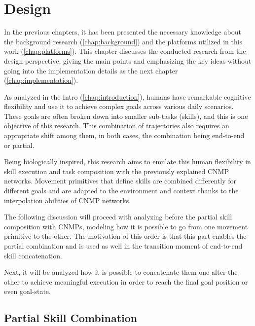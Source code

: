 \chapter{Design} 
\label{chap:design}

In the previous chapters, it has been presented the necessary knowledge about the background research (\cref{chap:background}) and the platforms utilized in this work (\cref{chap:platforms}). 
This chapter discusses the conducted research from the design perspective, giving the main points and emphasizing the key ideas without going into the implementation details as the next chapter (\cref{chap:implementation}). 

As analyzed in the Intro (\cref{chap:introduction}), humans have remarkable cognitive flexibility and use it to achieve complex goals across various daily scenarios. These goals are often broken down into smaller sub-tasks (skills), and this is one objective of this research. This combination of trajectories also requires an appropriate shift among them, in both cases, the combination being end-to-end or partial. 

Being biologically inspired, this research aims to emulate this human flexibility in skill execution and task composition with the previously explained CNMP networks. Movement primitives that define skills are combined differently for different goals and are adapted to the environment and context thanks to the interpolation abilities of CNMP networks.

The following discussion will proceed with analyzing before the partial skill composition with CNMPs, modeling how it is possible to go from one movement primitive to the other. The motivation of this order is that this part enables the partial combination and is used as well in the transition moment of end-to-end skill concatenation.

Next, it will be analyzed how it is possible to concatenate them one after the other to achieve meaningful execution in order to reach the final goal position or even goal-state.

\newpage
\section{Partial Skill Combination}

